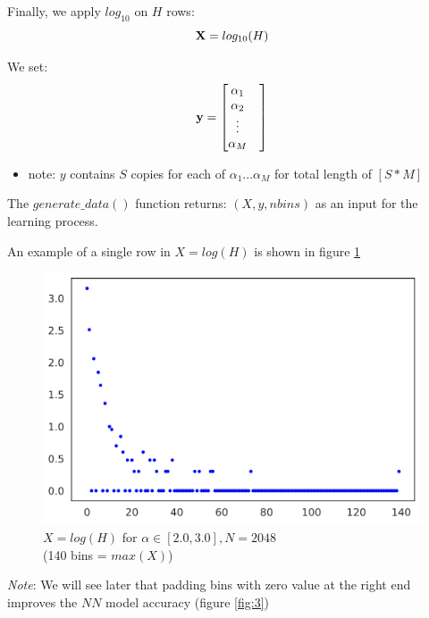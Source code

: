 \documentclass[a4paper, 12pt]{report}
\begin{document}
\par Finally, we apply $log_{10}$ on $H$ rows:
\begin{equation}
\label{eq:log_H}
    {\textbf X} = log_{10}(H)
\end{equation}

We set:
\begin{equation}
\label{eq:5}
{\textbf y} = \begin{bmatrix} 
    \alpha_1 & \\
    \alpha_2 & \\
    \vdots & \\
    \alpha_M & \\
\end{bmatrix}
\end{equation}

\begin{itemize}
  \item note: $y$ contains $S$ copies for each of $\alpha_1...\alpha_M$ for total length of $[S*M]$
\end{itemize}

\par The $generate\_data()$ function returns: $(X, y, nbins)$ as an input for the learning process.

\pagebreak
\par An example of a single row in $X = log(H)$ is shown in figure  \ref{fig:2}

\begin{figure}[h]
\centering
\includegraphics[width=0.7\linewidth]{./dataset}
\caption[Yule-Simon log-scale]{$X = log(H)$ for $\alpha\in[2.0,3.0], N=2048$ \\(140 bins = $max(X)$)}
\label{fig:2}
\end{figure}

\textit{Note}: We will see later that padding bins with zero value at the right end improves the $NN$ model accuracy (figure  \ref{fig:3})
\end{document}

